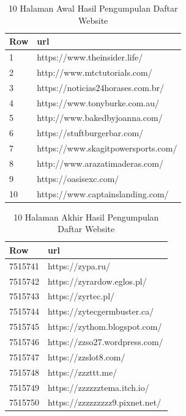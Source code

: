 \begin{table}[H]
	\centering
	\begin{tabular}{|l|l|}
		\hline
		\textbf{Row} & \textbf{url}\\
		\hline
		1 & https://www.theinsider.life/\\
		\hline
		2 & http://www.mtctutorials.com/ \\
		\hline
		3 & https://noticias24horases.com.br/\\
		\hline
		4 & https://www.tonyburke.com.au/ \\
		\hline
		5 & http://www.bakedbyjoanna.com/\\
		\hline
		6 & https://stuftburgerbar.com/\\
		\hline
		7 & https://www.skagitpowersports.com/\\
		\hline
		8 & http://www.arazatimaderas.com/ \\
		\hline
		9 & https://oasisexc.com/\\
		\hline
		10 & https://www.captainslanding.com/\\
		\hline
	\end{tabular}
	\caption{10 Halaman Awal Hasil Pengumpulan Daftar Website}
	\label{table:contoh_langkah411}
\end{table}

\begin{table}[H]
	\centering
	\begin{tabular}{|l|l|}
		\hline
		\textbf{Row} & \textbf{url}\\
		\hline
		7515741 & https://zypa.ru/
		\\
		\hline
		7515742 & https://zyrardow.eglos.pl/
		 \\
		\hline
		7515743 & https://zyrtec.pl/
		\\
		\hline
		7515744 & https://zytecgermbuster.ca/
		 \\
		\hline
		7515745 & https://zythom.blogspot.com/
		\\
		\hline
		7515746 & https://zzso27.wordpress.com/
		\\
		\hline
		7515747 & https://zzslot8.com/
		\\
		\hline
		7515748 & https://zzzttt.me/
		 \\
		\hline
		7515749 & https://zzzzzztema.itch.io/
		\\
		\hline
		7515750 & https://zzzzzzzzz9.pixnet.net/
		\\
		\hline
	\end{tabular}
	\caption{10 Halaman Akhir Hasil Pengumpulan Daftar Website}
	\label{table:contoh_langkah412}
\end{table}

